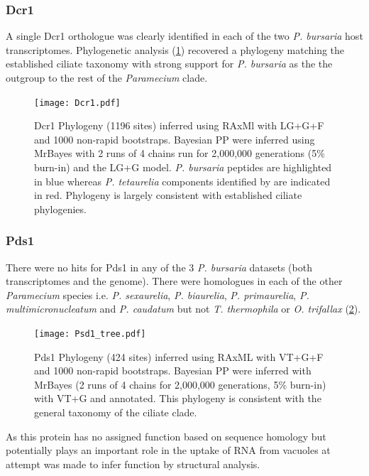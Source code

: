 \subsubsection{Dcr1}

A single Dcr1 orthologue was clearly identified in each of
the two \textit{P. bursaria} host transcriptomes.
Phylogenetic analysis (\cref{fig:dcr1}) recovered a phylogeny
matching the established ciliate taxonomy \citep{Aury2006,Fokin2004,Swart2013}
with strong support for \textit{P. bursaria} as the the outgroup to the rest of 
the \textit{Paramecium} clade. 

\begin{figure}
    \texttt{[image: Dcr1.pdf]}
    \caption[Dcr1 phylogeny]{Dcr1 Phylogeny (1196 sites) inferred using RAxMl with
        LG+G+F and 1000 non-rapid bootstraps.  Bayesian PP 
        were inferred using MrBayes with 2 runs of 4 chains run for 2,000,000
        generations (5\% burn-in) and the LG+G model.  \textit{P. bursaria} peptides
        are highlighted in blue whereas \textit{P. tetaurelia} components
    identified by \citep{Marker2014} are indicated in red.  Phylogeny
is largely consistent with established ciliate phylogenies.}
    \label{fig:dcr1}
\end{figure}


\subsubsection{Pds1}
There were no hits for Pds1 in any of the 3 \textit{P. bursaria} datasets 
(both transcriptomes and the genome).  
There were homologues in each of the other \textit{Paramecium} species
i.e. \textit{P. sexaurelia}, \textit{P. biaurelia}, \textit{P. primaurelia},
\textit{P. multimicronucleatum} and \textit{P. caudatum} but not
\textit{T. thermophila} or \textit{O. trifallax} (\cref{fig:pds1}).
\begin{figure}
    \texttt{[image: Psd1\_tree.pdf]}
    \caption[Pds1 phylogeny]{Pds1 Phylogeny (424 sites) inferred
        using RAxML with VT+G+F and 1000 non-rapid bootstraps.  Bayesian
        PP were inferred with MrBayes (2 runs of 4 chains for 2,000,000 generations, 5\% burn-in) 
        with VT+G and annotated. This phylogeny is consistent with the general
    taxonomy of the ciliate clade.}
\label{fig:pds1}
\end{figure}

As this protein has no assigned function based on sequence homology
\citep{Marker2014,Carradec2015}
but potentially plays an important role in the uptake of RNA 
from vacuoles at attempt was made to infer 
function by structural analysis. 

